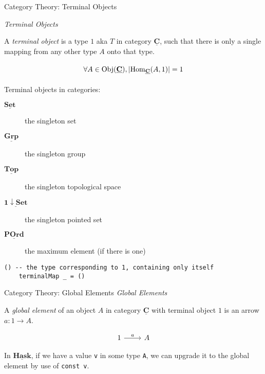 \documentclass[10pt]{beamer}
\newcommand{\Cat}[1]{\ensuremath{\underline{\mathbf{#1}}}}
\newcommand{\Obj}[1]{\ensuremath{\mathrm{Obj}(\Cat{#1})}}
\newcommand{\Hom}[3]{\ensuremath{\mathrm{Hom}_{\Cat{#1}}(#2,#3)}}
\theoremstyle{definition}
\theoremstyle{remark}
\numberwithin{equation}{section}
\begin{document}
\begin{frame}[fragile]{Category Theory: Terminal Objects}

  \emph{Terminal Objects}

  A \emph{terminal object} is a type $1$ aka $T$ in category $\Cat{C}$, such that there is only a single mapping from any other type $A$ onto that type.

  \[
  \begin{tikzcd}
    \forall A\in \Obj{C}, | \Hom{C}{A}{1} | = 1
  \end{tikzcd}
  \]

  Terminal objects in categories:
  \begin{description}
    \item[\Cat{Set}] the singleton set
    \item[\Cat{Grp}] the singleton group
    \item[\Cat{Top}] the singleton topological space
    \item[\Cat{1\downarrow Set}] the singleton pointed set
    \item[\Cat{POrd}] the maximum element (if there is one)
  \end{description}

  \begin{lstlisting}[frame=single]
    () -- the type corresponding to 1, containing only itself
    terminalMap _ = ()
  \end{lstlisting}

\end{frame}

\begin{frame}[fragile]{Category Theory: Global Elements}
  \emph{Global Elements}

  A \emph{global element} of an object $A$ in category $\Cat{C}$ with terminal object $1$ is an arrow $a : 1 \rightarrow A$.
  
  \[
  \begin{tikzcd}
    1 \arrow{r}{a} & A
  \end{tikzcd}
  \]

  In \Cat{Hask}, if we have a value \lstinline{v} in some type \lstinline{A}, we can upgrade it to the global element by use of \lstinline{const v}.

\end{frame}
\end{document}
